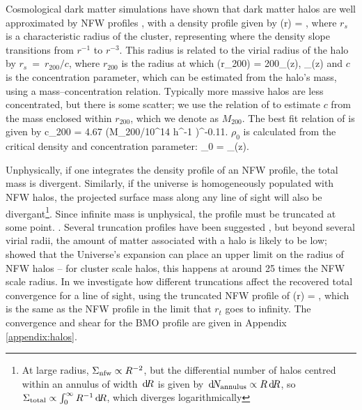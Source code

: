 \documentclass[useAMS,usenatbib]{mn2e}
\begin{document}
Cosmological dark matter simulations have shown that dark matter
halos are well approximated by NFW profiles \citep{NFW1997}, with a density
profile given by
\be\label{eq:rhonfw}
\rho(r) = 
,
\ee
where $r_{s}$ is a characteristic radius of the cluster, representing where
the density slope transitions from $r^{-1}$ to $r^{-3}$. This radius is related
to the virial radius of the halo by $r_{s}~=~r_{200}/c$, where $r_{200}$ is the radius at 
which 
\be
\rho(r_{200}) = 200\rho_{{}}(z),  \rho_{}(z) \equiv {}
\ee
and $c$ is the concentration parameter, which can be estimated from the halo's mass,
using a mass--concentration relation. Typically more massive halos are less concentrated,
but there is some scatter; we use the relation of \citet{neto2007} to estimate $c$
from the mass enclosed within $r_{200}$, which we denote as $M_{200}$. The best fit relation of \citet{neto2007} is given by
\be
c_{200} = 4.67 (M_{200}/10^{14} h^{-1} \Msun)^{-0.11}.
\ee
$\rho_0$ is calculated from the critical density and concentration parameter:
\be
\rho_0 = \rho_{}(z).
\ee

Unphysically, if one integrates the density profile of an NFW profile, the total mass is divergent.
Similarly, if the universe is homogeneously populated with NFW halos, the projected surface mass along any
line of sight will also be divergant\footnote{At large radius, $\Sigma_{\rm nfw} \propto R^{-2}$, but the differential number of halos centred within an annulus of width $\, \mathrm{d} \! R$ is given by $\, \mathrm{d} \! N_{\rm annulus} \propto R \, \mathrm{d} \! R$, so  $\Sigma_{\rm total} \propto \int_{0}^{\infty} R^{-1} \, \mathrm{d} \! R$, which diverges logarithmically}. Since infinite mass is unphysical, the profile must be truncated at some point. . Several truncation profiles have been suggested \citep[e.g][]{BMO}, but beyond several virial radii, the amount of matter associated with a halo is likely to be low; \citet{Nandra2012} showed that the Universe's expansion can place an upper limit on the radius of NFW halos -- for cluster scale halos, this happens at around 25 times the NFW scale radius. In  we investigate how different truncations affect the recovered total convergence for a line of sight, using the truncated NFW profile of \citet{BMO}
\be\label{eq:bmoprofile}
\rho(r) = 
,
\ee
which is the same as the NFW profile in the limit that $r_t$ goes to infinity. The convergence and shear for the BMO profile are given in Appendix \ref{appendix:halos}.
\end{document}
